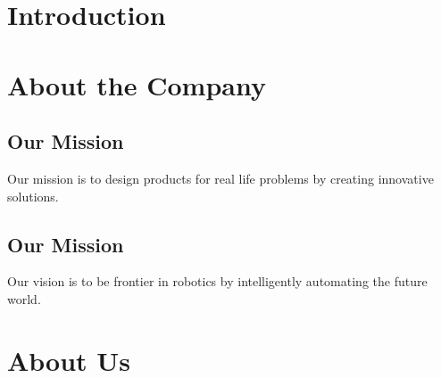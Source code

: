 \section{Introduction}
\-\indent 
	

\section{About the Company}



\subsection{Our Mission}
	Our mission is to design products for real life problems by creating innovative solutions.
	
	
	
\subsection{Our Mission}
	Our vision is to be frontier in robotics by intelligently automating the future world.


\section{About Us}


